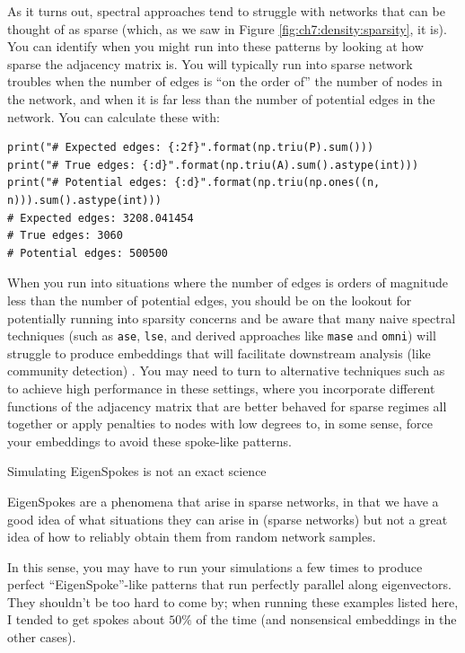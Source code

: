 As it turns out, spectral approaches tend to struggle with networks that can be thought of as sparse (which, as we saw in Figure \ref{fig:ch7:density:sparsity}, it is). You can identify when you might run into these patterns by looking at how sparse the adjacency matrix is. You will typically run into sparse network troubles when the number of edges is ``on the order of'' the number of nodes in the network, and when it is far less than the number of potential edges in the network. You can calculate these with:

\begin{lstlisting}[style=python]
print("# Expected edges: {:2f}".format(np.triu(P).sum()))
print("# True edges: {:d}".format(np.triu(A).sum().astype(int)))
print("# Potential edges: {:d}".format(np.triu(np.ones((n, n))).sum().astype(int)))
# Expected edges: 3208.041454
# True edges: 3060
# Potential edges: 500500
\end{lstlisting}

When you run into situations where the number of edges is orders of magnitude less than the number of potential edges, you should be on the lookout for potentially running into sparsity concerns and be aware that many naive spectral techniques (such as \texttt{ase}, \texttt{lse}, and derived approaches like \texttt{mase} and \texttt{omni}) will struggle to produce embeddings that will facilitate downstream analysis (like community detection) \cite{Lei2013Dec}. You may need to turn to alternative techniques such as \cite{Krzakala2013Dec,Chen2012} to achieve high performance in these settings, where you incorporate different functions of the adjacency matrix that are better behaved for sparse regimes all together or apply penalties to nodes with low degrees to, in some sense, force your embeddings to avoid these spoke-like patterns.

\begin{floatingbox}[h]\caption{Simulating EigenSpokes is not an exact science}
EigenSpokes are a phenomena that arise in sparse networks, in that we have a good idea of what situations they can arise in (sparse networks) but not a great idea of how to reliably obtain them from random network samples. 

In this sense, you may have to run your simulations a few times to produce perfect ``EigenSpoke''-like patterns that run perfectly parallel along eigenvectors. They shouldn't be too hard to come by; when running these examples listed here, I tended to get spokes about $50\%$ of the time (and nonsensical embeddings in the other cases). 
\end{floatingbox}

